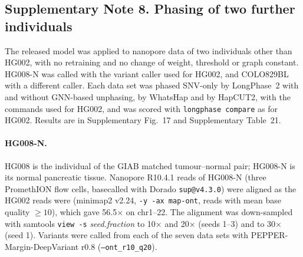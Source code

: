 \documentclass[11pt,a4paper]{article}
\newcommand{\toolname}{LongPhase~2\xspace}
\newcommand{\whatshap}{WhatsHap\xspace}
\newcommand{\hapcut}{HapCUT2\xspace}
\newcommand{\todo}[1]{\textcolor{red}{[#1]}}
\newcommand{\code}[1]{\texttt{\small #1}}
\begin{document}


\subsection*{Supplementary Note 8. Phasing of two further individuals}

The released model was applied to nanopore data of two individuals other than HG002, with no retraining and no change of weight, threshold or graph constant. HG008-N was called with the variant caller used for HG002, and COLO829BL with a different caller. Each data set was phased SNV-only by \toolname with and without GNN-based unphasing, by \whatshap and by \hapcut, with the commands used for HG002, and was scored with \code{longphase compare} as for HG002. Results are in Supplementary Fig.~17 and Supplementary Table~21.

\paragraph{HG008-N.} HG008 is the individual of the GIAB matched tumour--normal pair\cite{mcdaniel2025hg008}; HG008-N is its normal pancreatic tissue. Nanopore R10.4.1 reads of HG008-N (three PromethION flow cells, basecalled with Dorado \texttt{sup@v4.3.0}) were aligned as the HG002 reads were (minimap2 v2.24, \texttt{-y -ax map-ont}, reads with mean base quality $\ge 10$), which gave 56.5$\times$ on chr1--22. The alignment was down-sampled with samtools \texttt{view -s} \textit{seed.fraction} to 10$\times$ and 20$\times$ (seeds 1--3) and to 30$\times$ (seed 1). Variants were called from each of the seven data sets with PEPPER-Margin-DeepVariant r0.8 (\texttt{--ont\_r10\_q20}).
\end{document}
